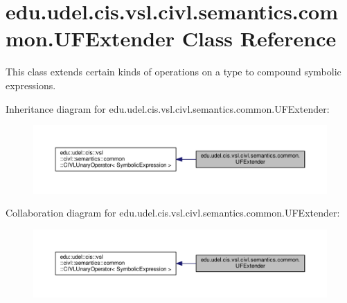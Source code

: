 \hypertarget{classedu_1_1udel_1_1cis_1_1vsl_1_1civl_1_1semantics_1_1common_1_1UFExtender}{}\section{edu.\+udel.\+cis.\+vsl.\+civl.\+semantics.\+common.\+U\+F\+Extender Class Reference}
\label{classedu_1_1udel_1_1cis_1_1vsl_1_1civl_1_1semantics_1_1common_1_1UFExtender}


This class extends certain kinds of operations on a type to compound symbolic expressions.  




Inheritance diagram for edu.\+udel.\+cis.\+vsl.\+civl.\+semantics.\+common.\+U\+F\+Extender\+:
\nopagebreak
\begin{figure}[H]
\begin{center}
\leavevmode
\includegraphics[width=350pt]{classedu_1_1udel_1_1cis_1_1vsl_1_1civl_1_1semantics_1_1common_1_1UFExtender__inherit__graph}
\end{center}
\end{figure}


Collaboration diagram for edu.\+udel.\+cis.\+vsl.\+civl.\+semantics.\+common.\+U\+F\+Extender\+:
\nopagebreak
\begin{figure}[H]
\begin{center}
\leavevmode
\includegraphics[width=350pt]{classedu_1_1udel_1_1cis_1_1vsl_1_1civl_1_1semantics_1_1common_1_1UFExtender__coll__graph}
\end{center}
\end{figure}
